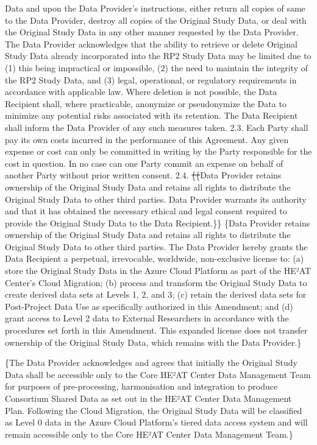 \documentclass[12pt,letterpaper]{article}
\newcommand{\deleted}[1]{\textcolor{deletecolor}{\sout{#1}}}
\newcommand{\added}[1]{\textcolor{addcolor}{#1}}
\begin{document}
Data and upon the Data Provider’s instructions, either return all copies of same to the Data Provider, destroy all copies of the Original Study Data, or deal with the Original Study Data in any other manner requested by the Data Provider. The Data Provider acknowledges that the ability to retrieve or delete Original Study Data already incorporated into the RP2 Study Data may be limited due to (1) this being impractical or impossible, (2) the need to maintain the integrity of the RP2 Study Data, and (3) legal, operational, or regulatory requirements in accordance with applicable law. Where deletion is not possible, the Data Recipient shall, where practicable, anonymize or pseudonymize the Data to minimize any potential risks associated with its retention. The Data Recipient shall inform the Data Provider of any such measures taken. 2.3.	Each Party shall pay its own costs incurred in the performance of this Agreement. Any given expense or cost can only be committed in writing by the Party responsible for the cost in question. In no case can one Party commit an expense on behalf of another Party without prior written consent. 2.4. \deleted\{\deleted\{Data Provider retains ownership of the Original Study Data and retains all rights to distribute the Original Study Data to other third parties. Data Provider warrants its authority and that it has obtained the necessary ethical and legal consent required to provide the Original Study Data to the Data Recipient.\}\} \added\{Data Provider retains ownership of the Original Study Data and retains all rights to distribute the Original Study Data to other third parties. The Data Provider hereby grants the Data Recipient a perpetual, irrevocable, worldwide, non-exclusive license to: (a) store the Original Study Data in the Azure Cloud Platform as part of the HE²AT Center's Cloud Migration; (b) process and transform the Original Study Data to create derived data sets at Levels 1, 2, and 3; (c) retain the derived data sets for Post-Project Data Use as specifically authorized in this Amendment; and (d) grant access to Level 2 data to External Researchers in accordance with the procedures set forth in this Amendment. This expanded license does not transfer ownership of the Original Study Data, which remains with the Data Provider.\}

\added\{The Data Provider acknowledges and agrees that initially the Original Study Data shall be accessible only to the Core HE²AT Center Data Management Team for purposes of pre-processing, harmonisation and integration to produce Consortium Shared Data as set out in the HE²AT Center Data Management Plan. Following the Cloud Migration, the Original Study Data will be classified as Level 0 data in the Azure Cloud Platform's tiered data access system and will remain accessible only to the Core HE²AT Center Data Management Team.\}
\end{document}
